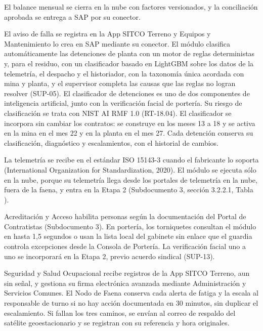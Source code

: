 \documentclass[subdoc]{../../comun/overfore}
\begin{document}
El balance mensual se cierra en la nube con factores versionados, y la conciliación aprobada se entrega a SAP por su conector.

El aviso de falla se registra en la App SITCO Terreno y Equipos y Mantenimiento lo crea en SAP mediante su conector. El módulo clasifica automáticamente las detenciones de planta con un motor de reglas deterministas y, para el residuo, con un clasificador basado en LightGBM sobre los datos de la telemetría, el despacho y el historiador, con la taxonomía única acordada con mina y planta, y el supervisor completa las causas que las reglas no logran resolver (SUP-05). El clasificador de detenciones es uno de dos componentes de inteligencia artificial, junto con la verificación facial de portería. Su riesgo de clasificación se trata con NIST AI RMF 1.0 (RT-18.04). El clasificador se incorpora sin cambiar los contratos: se construye en los meses 13 a 18 y se activa en la mina en el mes 22 y en la planta en el mes 27. Cada detención conserva su clasificación, diagnóstico y escalamientos, con el historial de cambios.

La telemetría se recibe en el estándar ISO 15143-3 cuando el fabricante lo soporta (International Organization for Standardization, 2020). El módulo se ejecuta sólo en la nube, porque su telemetría llega desde los portales de telemetría en la nube, fuera de la faena, y entra en la Etapa 2 (Subdocumento 3, sección 3.2.2.1, Tabla ).

Acreditación y Acceso habilita personas según la documentación del Portal de Contratistas (Subdocumento 3). En portería, los torniquetes consultan el módulo en hasta 1,5 segundos o usan la lista local del gabinete sin enlace que el guardia controla excepciones desde la Consola de Portería. La verificación facial uno a uno se incorporará en la Etapa 2, previo acuerdo sindical (SUP-13).

Seguridad y Salud Ocupacional recibe registros de la App SITCO Terreno, aun sin señal, y gestiona su firma electrónica avanzada mediante Administración y Servicios Comunes. El Nodo de Faena conserva cada alerta de fatiga y la escala al responsable de turno si no hay acción documentada en 30 minutos, sin duplicar el escalamiento. Si fallan los tres caminos, se envían al correo de respaldo del satélite geoestacionario y se registran con su referencia y hora originales.
\end{document}
